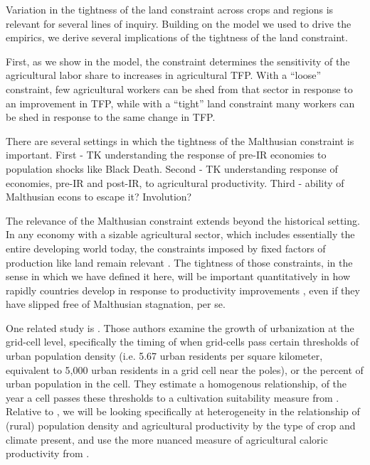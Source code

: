 \documentclass[11pt]{article}
\begin{document}
Variation in the tightness of the land constraint across crops and regions is relevant for several lines of inquiry. Building on the model we used to drive the empirics, we derive several implications of the tightness of the land constraint. 


First, as we show in the model, the constraint determines the sensitivity of the agricultural labor share to increases in agricultural TFP. With a ``loose'' constraint, few agricultural workers can be shed from that sector in response to an improvement in TFP, while with a ``tight'' land constraint many workers can be shed in response to the same change in TFP. 



There are several settings in which the tightness of the Malthusian constraint is important. First - TK understanding the response of pre-IR economies to population shocks like Black Death. Second - TK understanding response of economies, pre-IR and post-IR, to agricultural productivity. Third - ability of Malthusian econs to escape it?  Involution?

The relevance of the Malthusian constraint extends beyond the historical setting. In any economy with a sizable agricultural sector, which includes essentially the entire developing world today, the constraints imposed by fixed factors of production like land remain relevant \citep{weilwilde2009}. The tightness of those constraints, in the sense in which we have defined it here, will be important quantitatively in how rapidly countries develop in response to productivity improvements \citep{ev2016clim,ev2016}, even if they have slipped free of Malthusian stagnation, per se.



One related study is \citet{mfm2014}. Those authors examine the growth of urbanization at the grid-cell level, specifically the timing of when grid-cells pass certain thresholds of urban population density (i.e. 5.67 urban residents per square kilometer, equivalent to 5,000 urban residents in a grid cell near the poles), or the percent of urban population in the cell. They estimate a homogenous relationship, of the year a cell passes these thresholds to a cultivation suitability measure from \citet{ramankutty2002}. Relative to \citet{mfm2014}, we will be looking specifically at heterogeneity in the relationship of (rural) population density and agricultural productivity by the type of crop and climate present, and use the more nuanced measure of agricultural caloric productivity from \citet{galorozak2016}.
\end{document}
